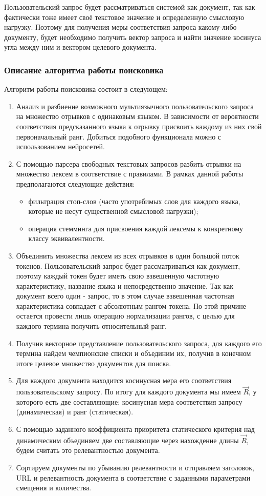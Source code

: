 Пользовательский запрос будет рассматриваться системой как документ, так как фактически тоже имеет своё текстовое значение и определенную смысловую нагрузку. Поэтому для получения меры соответствия запроса какому-либо документу, будет необходимо получить вектор запроса и найти значение косинуса угла между ним и вектором целевого документа.

\subsubsection{Описание алгоритма работы поисковика}
Алгоритм работы поисковика состоит в следующем:
\begin{enumerate}
\item Анализ и разбиение возможного мультиязычного пользовательского запроса на множество отрывков с одинаковым языком. В зависимости от вероятности соответствия предсказанного языка к отрывку присвоить каждому из них свой первоначальный ранг. Добиться подобного функционала можно с использованием нейросетей.
\item С помощью парсера свободных текстовых запросов разбить отрывки на множество лексем в соответствие с правилами. В рамках данной работы предполагаются следующие действия:
\begin{itemize}
\item фильтрация стоп-слов (часто употребимых слов для каждого языка, которые не несут существенной смысловой нагрузки);
\item операция стемминга для присвоения каждой лексемы к конкретному классу эквивалентности.
\end{itemize}
\item Объединить множества лексем из всех отрывков в один большой поток токенов. Пользовательский запрос будет рассматриваться как документ, поэтому каждый токен будет иметь свою взвешенную частотную характеристику, название языка и непосредственно значение. Так как документ всего один - запрос, то в этом случае взвешенная частотная характеристика совпадает с абсолютным рангом токена. По этой причине остается провести лишь операцию нормализации рангов, с целью для каждого термина получить относительный ранг.
\item Получив векторное представление пользовательского запроса, для каждого его термина найдем чемпионские списки и объединим их, получив в конечном итоге целевое множество документов для поиска.
\item Для каждого документа находится косинусная мера его соответствия пользовательскому запросу. По итогу для каждого документа мы имеем $\vec{R}$, у которого есть две составляющие: косинусная мера соответствия запросу (динамическая) и ранг (статическая).
\item С помощью заданного коэффициента приоритета статического критерия над динамическим объединяем две составляющие через нахождение длины $\vec{R}$, будем считать это релевантностью документа.
\item Сортируем документы по убыванию релевантности и отправляем заголовок, URL и релевантность документа в соответствие с заданными параметрами смещения и количества.
\end{enumerate}

